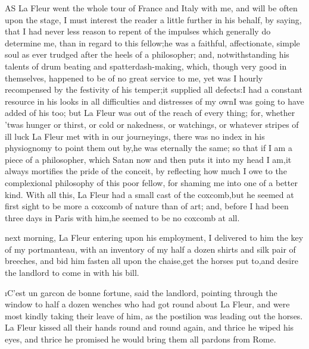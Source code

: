 \documentclass[twoside]{article}
\begin{document}
AS La Fleur went the whole tour of France and Italy with me, and will be
often upon the stage, I must interest the reader a little further in his
behalf, by saying, that I had never less reason to repent of the impulses
which generally do determine me, than in regard to this fellow;\tsk he was a
faithful, affectionate, simple soul as ever trudged after the heels of a
philosopher; and, notwithstanding his talents of drum beating and
spatterdash-making, which, though very good in themselves, happened to be
of no great service to me, yet was I hourly recompensed by the festivity
of his temper;\tsk it supplied all defects:\tsk I had a constant resource in his
looks in all difficulties and distresses of my own\tsk I was going to have
added of his too; but La Fleur was out of the reach of every thing; for,
whether ’twas hunger or thirst, or cold or nakedness, or watchings, or
whatever stripes of ill luck La Fleur met with in our journeyings, there
was no index in his physiognomy to point them out by,\tsk he was eternally
the same; so that if I am a piece of a philosopher, which Satan now and
then puts it into my head I am,\tsk it always mortifies the pride of the
conceit, by reflecting how much I owe to the complexional philosophy of
this poor fellow, for shaming me into one of a better kind.  With all
this, La Fleur had a small cast of the coxcomb,\tsk but he seemed at first
sight to be more a coxcomb of nature than of art; and, before I had been
three days in Paris with him,\tsk he seemed to be no coxcomb at all.






 next morning, La Fleur entering upon his employment, I delivered to
him the key of my portmanteau, with an inventory of my half a dozen
shirts and silk pair of breeches, and bid him fasten all upon the
chaise,\tsk get the horses put to,\tsk and desire the landlord to come in with
his bill.

\i{C’est un garcon de bonne fortune}, said the landlord, pointing through
the window to half a dozen wenches who had got round about La Fleur, and
were most kindly taking their leave of him, as the postilion was leading
out the horses.  La Fleur kissed all their hands round and round again,
and thrice he wiped his eyes, and thrice he promised he would bring them
all pardons from Rome.
\end{document}
